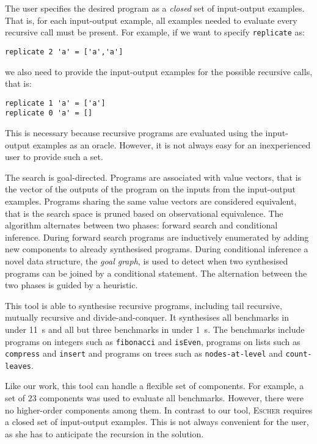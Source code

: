 The user specifies the desired program as a \emph{closed} set of input-output examples. That is, for each input-output example, all examples needed to evaluate every recursive call must be present. For example, if we want to specify \lstinline!replicate! as:
\begin{lstlisting}[style=plain]
replicate 2 'a' = ['a','a']
\end{lstlisting}
we also need to provide the input-output examples for the possible recursive calls, that is:
\begin{lstlisting}[style=plain]
replicate 1 'a' = ['a']
replicate 0 'a' = []
\end{lstlisting}
This is necessary because recursive programs are evaluated using the input-output examples as an oracle. However, it is not always easy for an inexperienced user to provide such a set.

The search is goal-directed. Programs are associated with value vectors, that is the vector of the outputs of the program on the inputs from the input-output examples. Programs sharing the same value vectors are considered equivalent, that is the search space is pruned based on observational equivalence.
The algorithm alternates between two phases: forward search and conditional inference. During forward search programs are inductively enumerated by adding new components to already synthesised programs. During conditional inference a novel data structure, the \emph{goal graph}, is used to detect when two synthesised programs can be joined by a conditional statement. The alternation between the two phases is guided by a heuristic.

This tool is able to synthesise recursive programs, including tail recursive, mutually recursive and divide-and-conquer. It synthesises all benchmarks in under \SI{11}{s} and all but three benchmarks in under \SI{1}{s}. The benchmarks include programs on integers such as \lstinline!fibonacci! and \lstinline!isEven!, programs on lists such as \lstinline!compress! and \lstinline!insert! and programs on trees such as \lstinline!nodes-at-level! and \lstinline!count-leaves!.

Like our work, this tool can handle a flexible set of components. For example, a set of $23$ components was used to evaluate all benchmarks. However, there were no higher-order components among them. In contrast to our tool, \textsc{Escher} requires a closed set of input-output examples. This is not always convenient for the user, as she has to anticipate the recursion in the solution.

